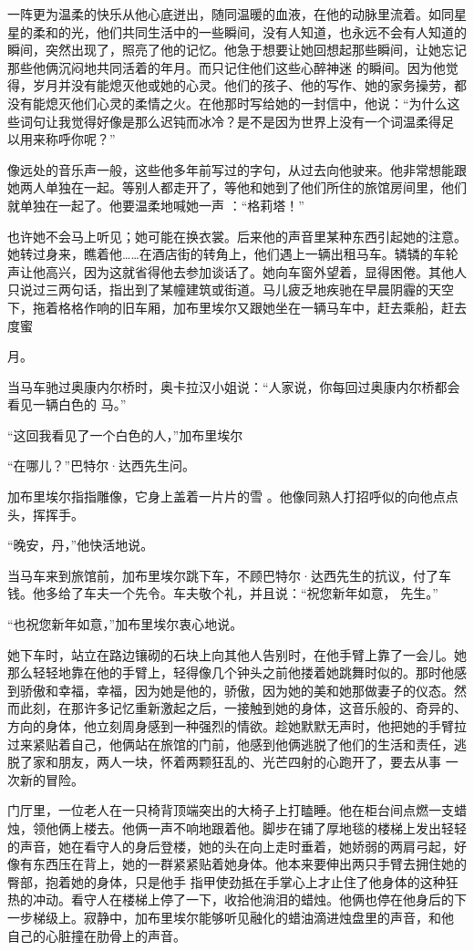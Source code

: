 \documentclass{article}
\begin{document}
一阵更为温柔的快乐从他心底迸出，随同温暖的血液，在他的动脉里流着。如同星星的柔和的光，他们共同生活中的一些瞬间，没有人知道，也永远不会有人知道的瞬间，突然出现了，照亮了他的记忆。他急于想要让她回想起那些瞬间，让她忘记那些他俩沉闷地共同活着的年月。而只记住他们这些心醉神迷
\newpage
的瞬间。因为他觉得，岁月并没有能熄灭他或她的心灵。他们的孩子、他的写作、她的家务操劳，都没有能熄灭他们心灵的柔情之火。在他那时写给她的一封信中，他说：“为什么这些词句让我觉得好像是那么迟钝而冰冷？是不是因为世界上没有一个词温柔得足
以用来称呼你呢？” 

像远处的音乐声一般，这些他多年前写过的字句，从过去向他驶来。他非常想能跟她两人单独在一起。等别人都走开了，等他和她到了他们所住的旅馆房间里，他们就单独在一起了。他要温柔地喊她一声
：“格莉塔！” 

也许她不会马上听见；她可能在换衣裳。后来他的声音里某种东西引起她的注意。她转过身来，瞧着他……在酒店街的转角上，他们遇上一辆出租马车。辚辚的车轮声让他高兴，因为这就省得他去参加谈话了。她向车窗外望着，显得困倦。其他人只说过三两句话，指出到了某幢建筑或街道。马儿疲乏地疾驰在早晨阴霾的天空下，拖着格格作响的旧车厢，加布里埃尔又跟她坐在一辆马车中，赶去乘船，赶去度蜜
\newpage

月。 

当马车驰过奥康内尔桥时，奥卡拉汉小姐说：“人家说，你每回过奥康内尔桥都会看见一辆白色的
马。” 

“这回我看见了一个白色的人，”加布里埃尔


“在哪儿？”巴特尔·达西先生问。 

加布里埃尔指指雕像，它身上盖着一片片的雪
。他像同熟人打招呼似的向他点点头，挥挥手。 


“晚安，丹，”他快活地说。 

当马车来到旅馆前，加布里埃尔跳下车，不顾巴特尔·达西先生的抗议，付了车钱。他多给了车夫一个先令。车夫敬个礼，并且说：“祝您新年如意，
先生。” 

“也祝您新年如意，”加布里埃尔衷心地说。
\newpage


她下车时，站立在路边镶砌的石块上向其他人告别时，在他手臂上靠了一会儿。她那么轻轻地靠在他的手臂上，轻得像几个钟头之前他搂着她跳舞时似的。那时他感到骄傲和幸福，幸福，因为她是他的，骄傲，因为她的美和她那做妻子的仪态。然而此刻，在那许多记忆重新激起之后，一接触到她的身体，这音乐般的、奇异的、方向的身体，他立刻周身感到一种强烈的情欲。趁她默默无声时，他把她的手臂拉过来紧贴着自己，他俩站在旅馆的门前，他感到他俩逃脱了他们的生活和责任，逃脱了家和朋友，两人一块，怀着两颗狂乱的、光芒四射的心跑开了，要去从事
一次新的冒险。 

门厅里，一位老人在一只椅背顶端突出的大椅子上打瞌睡。他在柜台间点燃一支蜡烛，领他俩上楼去。他俩一声不响地跟着他。脚步在铺了厚地毯的楼梯上发出轻轻的声音，她在看守人的身后登楼，她的头在向上走时垂着，她娇弱的两肩弓起，好像有东西压在背上，她的一群紧紧贴着她身体。他本来要伸出两只手臂去拥住她的臀部，抱着她的身体，只是他手
\newpage
指甲使劲抵在手掌心上才止住了他身体的这种狂热的冲动。看守人在楼梯上停了一下，收拾他淌泪的蜡烛。他俩也停在他身后的下一步梯级上。寂静中，加布里埃尔能够听见融化的蜡油滴进烛盘里的声音，和他
自己的心脏撞在肋骨上的声音。 
\end{document}

